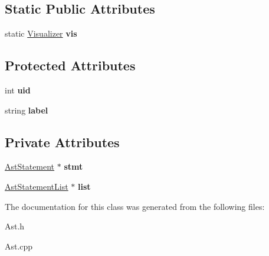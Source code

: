 \subsection*{Static Public Attributes}
\begin{DoxyCompactItemize}
\item 
\hypertarget{classAST_aca9e6637209b31e03a09c0d42f29bdfa}{static \hyperlink{classVisualizer}{Visualizer} {\bfseries vis}}\label{classAST_aca9e6637209b31e03a09c0d42f29bdfa}

\end{DoxyCompactItemize}
\subsection*{Protected Attributes}
\begin{DoxyCompactItemize}
\item 
\hypertarget{classAST_a847b778f1c3dd5a19de32de432ee6e15}{int {\bfseries uid}}\label{classAST_a847b778f1c3dd5a19de32de432ee6e15}

\item 
\hypertarget{classAST_ab2e239ccc0688d2341724432ff5a1a31}{string {\bfseries label}}\label{classAST_ab2e239ccc0688d2341724432ff5a1a31}

\end{DoxyCompactItemize}
\subsection*{Private Attributes}
\begin{DoxyCompactItemize}
\item 
\hypertarget{classAstStatementList_af53d733dee93a0c5740e1983e0ee5d78}{\hyperlink{classAstStatement}{Ast\-Statement} $\ast$ {\bfseries stmt}}\label{classAstStatementList_af53d733dee93a0c5740e1983e0ee5d78}

\item 
\hypertarget{classAstStatementList_ae730c57d9b75272e9792b175564a756e}{\hyperlink{classAstStatementList}{Ast\-Statement\-List} $\ast$ {\bfseries list}}\label{classAstStatementList_ae730c57d9b75272e9792b175564a756e}

\end{DoxyCompactItemize}


The documentation for this class was generated from the following files\-:\begin{DoxyCompactItemize}
\item 
Ast.\-h\item 
Ast.\-cpp\end{DoxyCompactItemize}
